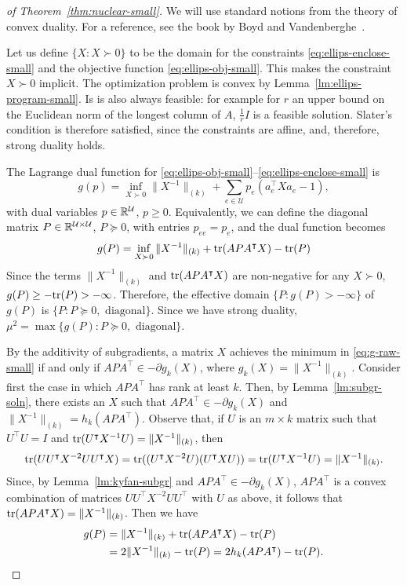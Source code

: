 \documentclass{article}
\def\tr{{\rm tr}} \def\rank{{\rm rank}}
\newcommand{\univ}{U}
\newcommand{\tra}{\intercal}
\renewcommand{\univ}{\mathcal{U}}
\begin{document}
\begin{proof}[of Theorem~\ref{thm:nuclear-small}]
  We will use standard notions from the theory of convex duality. For
  a reference, see the book by Boyd and Vandenberghe~\cite{BoydV-cvx}.

  Let us define $\{X: X \succ 0\}$ to be the domain for the
  constraints \eqref{eq:ellips-enclose-small} and the objective
  function \eqref{eq:ellips-obj-small}. This makes the constraint $X
  \succ 0$ implicit.  The optimization problem is convex by
  Lemma~\ref{lm:ellips-program-small}. Is is also always feasible: for
  example for $r$ an upper bound on the Euclidean norm of the longest
  column of $A$, $\frac{1}{r}I$ is a feasible
  solution. Slater's condition is therefore satisfied, since the
  constraints are affine, and, therefore, strong duality holds.

  The Lagrange dual function for
  \eqref{eq:ellips-obj-small}--\eqref{eq:ellips-enclose-small} is
  \begin{equation*}
    g(p) = \inf_{X \succ 0}{\|X^{-1}\|_{(k)} + \sum_{e \in \univ}{p_e(a_e^\intercal Xa_e - 1)} },
  \end{equation*}
  with dual variables $p \in \R^\univ$, $p \geq 0$. Equivalently, we
  can define the diagonal matrix $P \in \R^{\univ\times \univ}$, $P \succeq
  0$, with entries $p_{ee} = p_e$, and the dual function becomes
  \begin{equation}\label{eq:g-raw-small}
    g(P) = \inf_{X\succ 0}{\|X^{-1}\|_{(k)} + \tr(APA^\intercal X) - \tr(P)}
  \end{equation}
  Since the terms $\|X^{-1}\|_{(k)}$ and $\tr(APA^\intercal X)$ are
  non-negative for any $X \succ 0$, $g(P) \geq -\tr(P) >
  -\infty$. Therefore, the effective domain $\{P: g(P) > -\infty\}$ of
  $g(P)$ is $\{P: P\succeq 0, \text{ diagonal}\}$. Since we have
  strong duality, $\mu^2 = \max\{g(P): P\succeq 0, \text{ diagonal}\}$.
  
  By the additivity of subgradients, a matrix $X$  achieves the minimum
  in \eqref{eq:g-raw-small} if and only if $APA^\tra \in -\partial g_k(X)$,
  where $g_k(X) = \|X^{-1}\|_{(k)}$.  Consider first the case in which
  $APA^\tra$ has rank at least $k$. Then, by Lemma~\ref{lm:subgr-soln},
  there exists an $X$ such that $APA^\tra \in -\partial g_k(X)$ and
  $\|X^{-1}\|_{(k)} = h_k(APA^\tra)$. Observe that, if $U$ is an $m
  \times k$ matrix such
  that $U^\tra U = I$ and $\tr(U^\tra X^{-1} U) = \|X^{-1}\|_{(k)}$,
  then 
  \[
  \tr(UU^\tra X^{-2} UU^\tra X) = \tr((U^\tra X^{-2}U)(U^\tra X U))
  = \tr(U^\tra X^{-1} U) = \|X^{-1}\|_{(k)}.
  \]
  Since, by Lemma~\ref{lm:kyfan-subgr} and $APA^\tra \in -\partial g_k(X)$, $APA^\tra$ is a convex combination of matrices $UU^\tra X^{-2}  UU^\tra$ with $U$ as above, it follows that $\tr(APA^\tra X) =
  \|X^{-1}\|_{(k)}$. Then we have
  \begin{align}
  g(P) &= \|X^{-1}\|_{(k)} + \tr(APA^\intercal X) - \tr(P)\notag\\
  &= 2\|X^{-1}\|_{(k)} - \tr(P) = 2h_k(APA^\tra) - \tr(P).\label{eq:g-small-raw}
  \end{align}


\end{proof}
\end{document}
